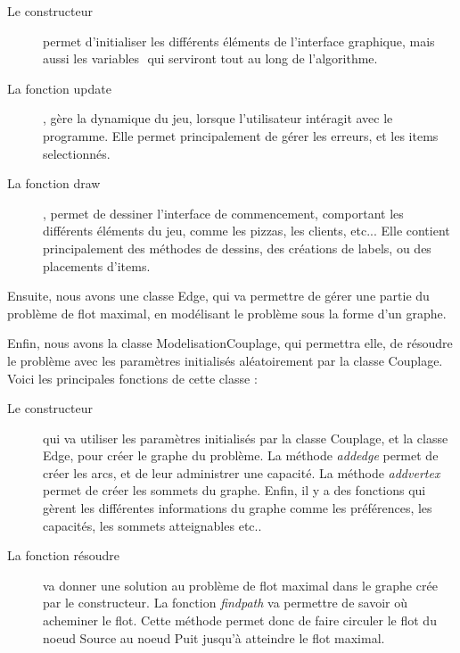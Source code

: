 \documentclass{scrreprt}
\begin{document}
	\begin{description}
		\item[Le constructeur] permet d'initialiser les différents éléments de l'interface graphique, mais aussi les variables ​
		 qui serviront tout au long de l'algorithme.
		\item[La fonction update], gère la dynamique du jeu, lorsque l'utilisateur intéragit avec le programme.
		 Elle permet principalement de gérer les erreurs, et les items selectionnés.
		\item[La fonction draw], permet de dessiner l'interface de commencement, comportant les différents éléments du jeu,
		 comme les pizzas, les clients, etc... Elle contient principalement des méthodes de dessins, des créations de labels,
		 ou des placements d'items.
	\end{description}

	Ensuite, nous avons une classe Edge, qui va permettre de gérer une partie du problème de flot maximal, en modélisant le problème
	 sous la forme d'un graphe.

	Enfin, nous avons la classe ModelisationCouplage, qui permettra elle, de résoudre le problème avec les paramètres initialisés
	 aléatoirement par la classe Couplage. Voici les principales fonctions de cette classe :

	\begin{description}
		\item[Le constructeur] qui va utiliser les paramètres initialisés par la classe Couplage, et la classe Edge, pour créer le
		 graphe du problème. La méthode \emph{addedge} permet de créer les arcs, et de leur administrer une capacité. 
		 La méthode \emph{addvertex} permet de créer les sommets du graphe. Enfin, il y a des fonctions qui gèrent les différentes informations
		 du graphe comme les préférences, les capacités, les sommets atteignables etc..
		\item[La fonction résoudre] va donner une solution au problème de flot maximal dans le graphe crée par le constructeur. La fonction
		 \emph{findpath} va permettre de savoir où acheminer le flot. Cette méthode permet donc de faire circuler le flot du noeud Source
		 au noeud Puit jusqu'à atteindre le flot maximal.
	\end{description}
\end{document}
